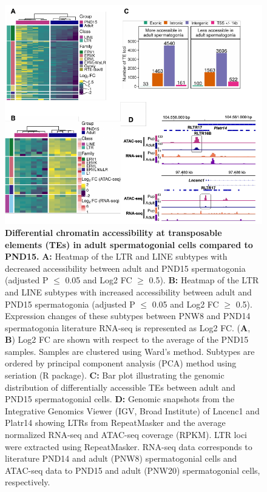 \documentclass[12pt,twoside]{reedthesis}
\begin{document}
\begin{subfigures}


\begin{figure}[H]

{\centering \includegraphics{thesis_files/figure-latex/df5a-1} 

}

\caption[Differential chromatin accessibility at transposable elements (TEs) in adult spermatogonial cells compared to PND15]{\textbf{Differential chromatin accessibility at transposable elements (TEs) in adult spermatogonial cells compared to PND15.} \newline \textbf{A:} Heatmap of the LTR and LINE subtypes with decreased accessibility between adult and PND15 spermatogonia (adjusted P $\leq$ 0.05 and Log2 FC $\geq$ 0.5). \newline \textbf{B:} Heatmap of the LTR and LINE subtypes with increased accessibility between adult and PND15 spermatogonia (adjusted P $\leq$ 0.05 and Log2 FC $\geq$ 0.5). Expression changes of these subtypes between PNW8 and PND14 spermatogonia literature RNA-seq is represented as Log2 FC. \newline (\textbf{A}, \textbf{B}) Log2 FC are shown with respect to the average of the PND15 samples. Samples are clustered using Ward’s method. Subtypes are ordered by principal component analysis (PCA) method using seriation (R package). \newline \textbf{C:} Bar plot illustrating the genomic distribution of differentially accessible TEs between adult and PND15 spermatogonial cells. \newline \textbf{D:} Genomic snapshots from the Integrative Genomics Viewer (IGV, Broad Institute) of Lncenc1 and Platr14 showing LTRs from RepeatMasker and the average normalized RNA-seq and ATAC-seq coverage (RPKM). LTR loci were extracted using RepeatMasker. RNA-seq data corresponds to literature PND14 and adult (PNW8) spermatogonial cells and  ATAC-seq data to PND15 and adult (PNW20) spermatogonial cells, respectively.}\label{fig:df5a}
\end{figure}



\end{subfigures}
\end{document}
